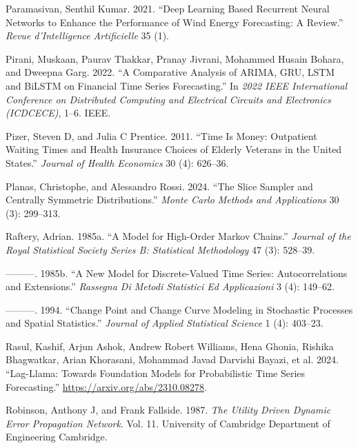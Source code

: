 \documentclass[
  letterpaper,
  double,
  12pt,
  1.0in]{beavtex}
\newlength{\cslhangindent}
\newenvironment{CSLReferences}[2] %
 {\begin{list}{}{%
  \setlength{\itemindent}{0pt}
  \setlength{\leftmargin}{0pt}
  \setlength{\parsep}{0pt}
  \ifodd #1
   \setlength{\leftmargin}{\cslhangindent}
   \setlength{\itemindent}{-1\cslhangindent}
  \fi
  \setlength{\itemsep}{#2\baselineskip}}}
 {\end{list}}
\begin{document}
\begin{CSLReferences}{1}{0}
Paramasivan, Senthil Kumar. 2021. {``Deep Learning Based Recurrent
Neural Networks to Enhance the Performance of Wind Energy Forecasting: A
Review.''} \emph{Revue d'Intelligence Artificielle} 35 (1).

Pirani, Muskaan, Paurav Thakkar, Pranay Jivrani, Mohammed Husain Bohara,
and Dweepna Garg. 2022. {``A Comparative Analysis of ARIMA, GRU, LSTM
and BiLSTM on Financial Time Series Forecasting.''} In \emph{2022 IEEE
International Conference on Distributed Computing and Electrical
Circuits and Electronics (ICDCECE)}, 1--6. IEEE.

Pizer, Steven D, and Julia C Prentice. 2011. {``Time Is Money:
Outpatient Waiting Times and Health Insurance Choices of Elderly
Veterans in the United States.''} \emph{Journal of Health Economics} 30
(4): 626--36.

Planas, Christophe, and Alessandro Rossi. 2024. {``The Slice Sampler and
Centrally Symmetric Distributions.''} \emph{Monte Carlo Methods and
Applications} 30 (3): 299--313.

Raftery, Adrian. 1985a. {``A Model for High-Order Markov Chains.''}
\emph{Journal of the Royal Statistical Society Series B: Statistical
Methodology} 47 (3): 528--39.

---------. 1985b. {``A New Model for Discrete-Valued Time Series:
Autocorrelations and Extensions.''} \emph{Rassegna Di Metodi Statistici
Ed Applicazioni} 3 (4): 149--62.

---------. 1994. {``Change Point and Change Curve Modeling in Stochastic
Processes and Spatial Statistics.''} \emph{Journal of Applied
Statistical Science} 1 (4): 403--23.

Rasul, Kashif, Arjun Ashok, Andrew Robert Williams, Hena Ghonia, Rishika
Bhagwatkar, Arian Khorasani, Mohammad Javad Darvishi Bayazi, et al.
2024. {``Lag-Llama: Towards Foundation Models for Probabilistic Time
Series Forecasting.''} \url{https://arxiv.org/abs/2310.08278}.

Robinson, Anthony J, and Frank Fallside. 1987. \emph{The Utility Driven
Dynamic Error Propagation Network}. Vol. 11. University of Cambridge
Department of Engineering Cambridge.


\end{CSLReferences}
\end{document}
